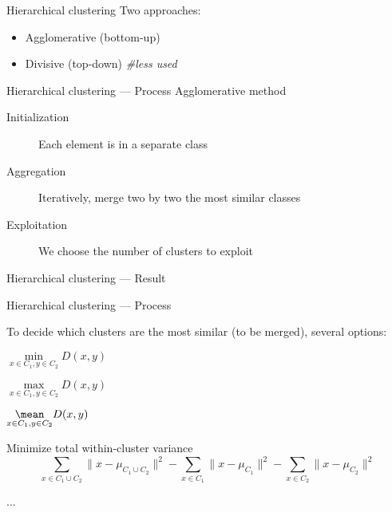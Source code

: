 
\begin{frame}{Hierarchical clustering}
  Two approaches:

  \begin{itemize}
    \item Agglomerative (bottom-up)
    \item Divisive (top-down) \textit{\#less used}
  \end{itemize}
\end{frame}

\begin{frame}{Hierarchical clustering --- Process}
  Agglomerative method

  \begin{description}
    \item[Initialization] Each element is in a separate class
    \item[Aggregation] Iteratively, merge two by two the most similar classes
    \item[Exploitation] We choose the number of clusters to exploit
  \end{description}
\end{frame}

\begin{frame}{Hierarchical clustering --- Result}
\end{frame}

\begin{frame}{Hierarchical clustering --- Process}

  To decide which clusters are the most similar (to be merged), several options:

  \begin{description}
  \item[Minimal linkage] $\underset{x \in C_1,y \in C_2}{\min}{D(x,y)}$
  \item[Maximal linkage] $\underset{x \in C_1,y \in C_2}{\max}{D(x,y)}$
  \item[Average linkage] $\underset{x \in C_1,y \in C_2}{\mean}{D(x,y)}$
  \item[Ward linkage] Minimize total within-cluster variance
  \[
    \sum_{x\in C_1\cup C_2} \lVert x - \mu_{C_1\cup C_2} \rVert^2
    - \sum_{x\in C_1} \lVert x - \mu_{C_1} \rVert^2
    - \sum_{x\in C_2} \lVert x - \mu_{C_2} \rVert^2
  \]  
  \item ...
  \end{description}

\end{frame}
